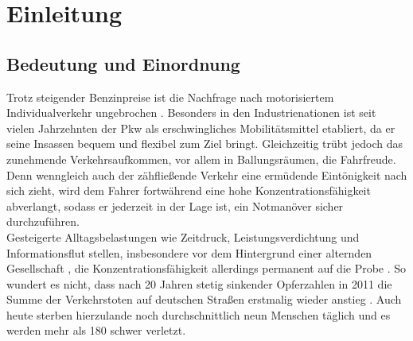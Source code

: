 
\chapter{Einleitung}





\section{Bedeutung und Einordnung}
Trotz steigender Benzinpreise ist die Nachfrage nach motorisiertem Individualverkehr ungebrochen \cite{chlond2009mobilitatspanel}. Besonders in den Industrienationen ist seit vielen Jahrzehnten der Pkw als erschwingliches Mobilitätsmittel etabliert, da er seine Insassen bequem und flexibel zum Ziel bringt. Gleichzeitig trübt jedoch das zunehmende Verkehrsaufkommen, vor allem in Ballungsräumen, die Fahrfreude. Denn wenngleich auch der zähfließende Verkehr eine ermüdende Eintönigkeit nach sich zieht, wird dem Fahrer fortwährend eine hohe Konzentrationsfähigkeit abverlangt, sodass er jederzeit in der Lage ist, ein Notmanöver sicher durchzuführen. \\
Gesteigerte Alltagsbelastungen wie Zeitdruck,  Leistungsverdichtung und Informationsflut stellen, insbesondere vor dem Hintergrund einer alternden Gesellschaft \cite{birck2010potenziale}, die Konzentrationsfähigkeit allerdings permanent auf die Probe \cite{NHTSA2006100car}. So wundert es nicht, dass nach 20 Jahren stetig sinkender Opferzahlen in 2011 die Summe der Verkehrstoten auf deutschen Straßen erstmalig wieder anstieg \cite{StatistischesBundesamtDeutschland2012}. Auch heute sterben hierzulande noch durchschnittlich neun Menschen täglich und es werden mehr als 180 schwer verletzt.

